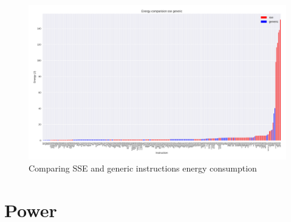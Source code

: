 \begin{figure}
	\centering
	\includegraphics[width=\textwidth]{experiments/figures/inst_en_cmp_sse_generic.png}
	\caption{Comparing SSE and generic instructions energy consumption}
	\label{fig:experiment_en7}
\end{figure}

\section{Power}

